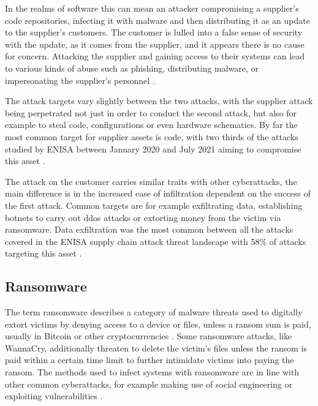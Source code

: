 In the realms of software this can mean an attacker compromising a supplier's code repositories, infecting
it with malware and then distributing it as an update to the supplier's customers. The customer is lulled into
a false sense of security with the update, as it comes from the supplier, and it appears there is no cause for 
concern. Attacking the supplier and gaining access to their systems can lead to various kinds of abuse 
such as phishing, distributing malware, or impersonating the supplier's personnel \cite{enisa_supply_chain_threat_landscape}.

The attack targets vary slightly between the two attacks, with the supplier attack being perpetrated not just 
in order to conduct the second attack, but also for example to steal code, configurations or even hardware schematics.
By far the most common target for supplier assets is code, with two thirds of the attacks studied by \acrshort{ENISA}
between January 2020 and July 2021 aiming to compromise this asset \cite{enisa_supply_chain_threat_landscape}. 

The attack on the customer carries similar traits with other cyberattacks, the main difference is in the increased 
ease of infiltration dependent on the success of the first attack.
Common targets are for example exfiltrating data, establishing botnets to carry out \acrfull{ddos} attacks or
extorting money from the victim via ransomware. Data exfiltration was the most common between all the attacks
covered in the \acrshort{ENISA} supply chain attack threat landscape with 58\% of attacks targeting this asset
\cite{enisa_supply_chain_threat_landscape}. 


\subsection{Ransomware}
The term ransomware describes a category of malware threats used to digitally extort victims 
by denying access to a device or files, unless a ransom sum is paid, usually in Bitcoin or other 
cryptocurrencies \cite[p.~150]{ransomware_book}. Some ransomware attacks, like WannaCry, additionally 
threaten to delete the victim's files unless the ransom is paid within a certain time limit to further
intimidate victims into paying the ransom. The methods used to infect systems with ransomware are in line
with other common cyberattacks, for example making use of social engineering or exploiting vulnerabilities
\cite{nist_ransomware}.

